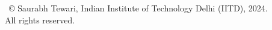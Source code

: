 \begin{center}

\large

\ \\ \
\vspace{16cm}
\ \\ \
\copyright{ Saurabh Tewari, Indian Institute of Technology Delhi (IITD), 2024.}
\\ All rights reserved.

\end{center}

